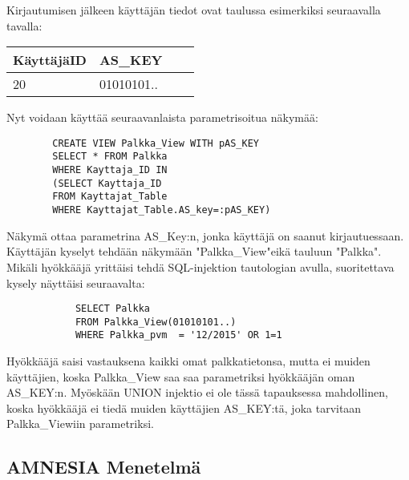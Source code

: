 \documentclass[finnish]{tktltiki2}
\theoremstyle{definition}
\theoremstyle{remark}
\begin{document}
		Kirjautumisen jälkeen käyttäjän tiedot ovat taulussa esimerkiksi seuraavalla tavalla:
	
		\begin{center}
		\begin{tabular}{| l | l | l | l |}
			\hline
			KäyttäjäID & AS\_KEY \\ \hline
			\hline
			20 &  01010101.. \\
			\hline
		\end{tabular}
		\end{center}
	

		Nyt voidaan käyttää seuraavanlaista parametrisoitua näkymää:
		\begin{lstlisting}
		CREATE VIEW Palkka_View WITH pAS_KEY
		SELECT * FROM Palkka
		WHERE Kayttaja_ID IN
		(SELECT Kayttaja_ID
		FROM Kayttajat_Table
		WHERE Kayttajat_Table.AS_key=:pAS_KEY) 
		\end{lstlisting}
		Näkymä ottaa parametrina AS\_Key:n, jonka käyttäjä on saanut kirjautuessaan. Käyttäjän kyselyt tehdään näkymään "Palkka\_View"\space eikä tauluun "Palkka". Mikäli hyökkääjä yrittäisi tehdä SQL-injektion tautologian avulla, suoritettava kysely näyttäisi seuraavalta:
		\begin{lstlisting}
			SELECT Palkka
			FROM Palkka_View(01010101..) 
			WHERE Palkka_pvm  = '12/2015' OR 1=1
		\end{lstlisting}
		Hyökkääjä saisi vastauksena kaikki omat palkkatietonsa, mutta ei muiden käyttäjien, koska Palkka\_View saa saa parametriksi hyökkääjän oman AS\_KEY:n. Myöskään UNION injektio ei ole tässä tapauksessa mahdollinen, koska hyökkääjä ei tiedä muiden käyttäjien AS\_KEY:tä, joka tarvitaan Palkka\_Viewiin parametriksi.
	
	\subsection{AMNESIA Menetelmä}
	
\end{document}
